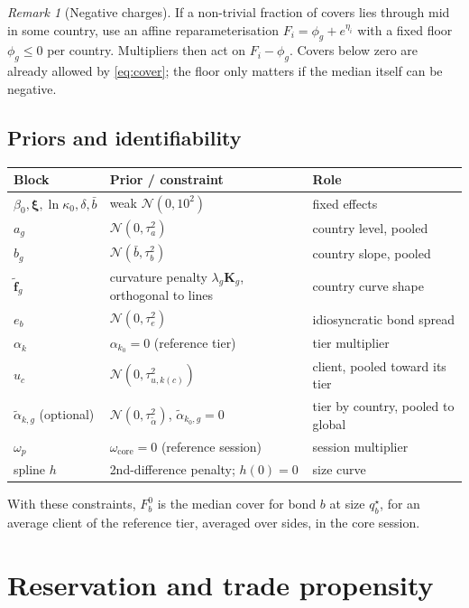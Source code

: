 \documentclass[11pt,a4paper]{article}
\theoremstyle{definition}
\theoremstyle{remark}
\newtheorem{remark}{Remark}
\newcommand{\bff}{\bm{f}}
\begin{document}
\begin{remark}[Negative charges]
If a non-trivial fraction of covers lies through mid in some country, use an affine reparameterisation $F_i=\phi_g+e^{\eta_i}$ with a fixed floor $\phi_g\le 0$ per country. Multipliers then act on $F_i-\phi_g$. Covers below zero are already allowed by \eqref{eq:cover}; the floor only matters if the median itself can be negative.
\end{remark}

\subsection{Priors and identifiability}
\begin{center}
\small
\begin{tabular}{lll}
\toprule
Block & Prior / constraint & Role \\
\midrule
$\beta_0,\bm\xi,\ln\kappa_0,\delta,\bar b$ & weak $\mathcal N(0,10^2)$ & fixed effects \\
$a_g$ & $\mathcal N(0,\tau_a^2)$ & country level, pooled \\
$b_g$ & $\mathcal N(\bar b,\tau_b^2)$ & country slope, pooled \\
$\tilde{\bff}_g$ & curvature penalty $\lambda_g\bm K_g$, orthogonal to lines & country curve shape \\
$e_b$ & $\mathcal N(0,\tau_e^2)$ & idiosyncratic bond spread \\
$\alpha_k$ & $\alpha_{k_0}=0$ (reference tier) & tier multiplier \\
$u_c$ & $\mathcal N(0,\tau^2_{u,k(c)})$ & client, pooled toward its tier \\
$\tilde\alpha_{k,g}$ (optional) & $\mathcal N(0,\tau_{\tilde\alpha}^2)$, $\tilde\alpha_{k_0,g}=0$ & tier by country, pooled to global \\
$\omega_p$ & $\omega_{\mathrm{core}}=0$ (reference session) & session multiplier \\
spline $h$ & 2nd-difference penalty; $h(0)=0$ & size curve \\
\bottomrule
\end{tabular}
\end{center}
With these constraints, $F^0_b$ is the median cover for bond $b$ at size $q^\star_b$, for an average client of the reference tier, averaged over sides, in the core session.

\section{Reservation and trade propensity}\label{sec:reservation}
\end{document}
